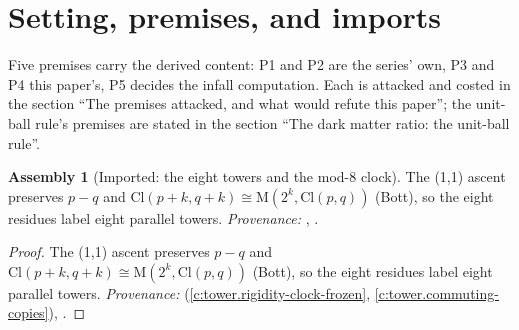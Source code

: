 \documentclass[11pt]{article}
\theoremstyle{definition}
\newtheorem{assembled}[theorem]{Assembly}
\theoremstyle{plain}
\providecommand{\Cl}{}\renewcommand{\Cl}{\mathrm{Cl}}
\providecommand{\Mat}{}\renewcommand{\Mat}{\mathrm{M}}
\begin{document}
\section{Setting, premises, and imports}

\label{c:note.dark-matter.setting-setting-premises-imports}
Five premises carry the derived content: P1 and P2 are the series' own, P3 and P4 this paper's, P5 decides the infall computation. Each is attacked and costed in the section ``The premises attacked, and what would refute this paper''; the unit-ball rule's premises are stated in the section ``The dark matter ratio: the unit-ball rule''.

\begin{assembled}[Imported: the eight towers and the mod-8 clock]\label{c:dark-matter.imported-eight-towers-mod-8-clock}
The (1,1) ascent preserves $p - q$ and $\Cl(p+k, q+k) \cong \Mat(2^{k}, \Cl(p,q))$ (Bott), so the eight residues label eight parallel towers. \emph{Provenance:} \cite[Thms.~3.2, 3.6, Rem.~3.7]{ButlerT3}, \cite[\S7]{ButlerT1}.
\end{assembled}
\begin{proof}
The (1,1) ascent preserves $p - q$ and $\Cl(p+k, q+k) \cong \Mat(2^{k}, \Cl(p,q))$ (Bott), so the eight residues label eight parallel towers. \emph{Provenance:} \cite[Thms.~3.2, 3.6, Rem.~3.7]{ButlerT3} (\ref{c:tower.rigidity-clock-frozen}, \ref{c:tower.commuting-copies}), \cite[\S7]{ButlerT1}.

\end{proof}
\end{document}
